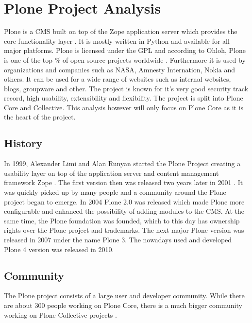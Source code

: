 \section{Plone Project Analysis} %


Plone is a \ac{CMS} built on top of the Zope application server which provides
the core functionality layer \cite{Aspeli2005,PloneFaq,PloneWhatIsPlone}. It is
mostly written in Python and available for all major platforms. Plone is
licensed under the \ac{GPL} and according to Ohloh, Plone is one of the top
\unit[2]{\%} of open source projects worldwide \cite{PloneOhlohFactoids}.
Furthermore it is used by organizations and companies such as NASA, Amnesty
Internation, Nokia and others. It can be used for a wide range of websites such
as internal websites, blogs, groupware and other. The project is known for it's
very good security track record, high usability, extensibility and flexibility.
The project is split into Plone Core and Collective. This analysis however will
only focus on Plone Core as it is the heart of the project.

\subsection{History} %

In 1999, Alexander Limi and Alan Runyan started the Plone Project creating a
usability layer on top of the application server and content management
framework Zope \cite{Aspeli2005,PloneFaq}. The first version then was released
two years later in 2001 \cite{PloneReleases}. It was quickly picked up by many
people and a community around the Plone project began to emerge. In 2004 Plone
2.0 was released which made Plone more configurable and enhanced the
possibility of adding modules to the \ac{CMS}. At the same time, the Plone
foundation was founded, which to this day has ownership rights over the Plone
project and trademarks. The next major Plone version was released in 2007 under
the name Plone 3. The nowadays used and developed Plone 4 version was released
in 2010.


\subsection{Community} %

The Plone project consists of a large user and developer community. While there
are about 300 people working on Plone Core, there is a much bigger community
working on Plone Collective projects
\cite{Aspeli2005,PloneOhlohFactoids,PloneCommunityProcesses}.

